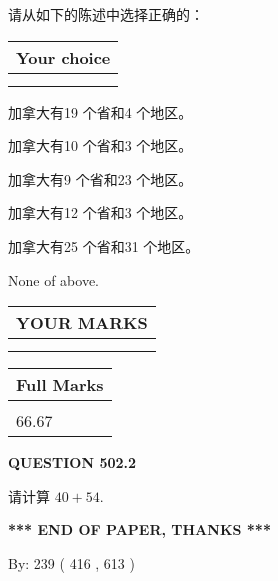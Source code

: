 \documentclass{ctexart}
\begin{document}
  
请从如下的陈述中选择正确的：
  
  
\noindent\hspace{3.0in} \begin{tabular}{|l|}
\hline
Your choice \\
\hline
 \\ 
 \\ 
\hline
\end{tabular}
  
  
 
 
加拿大有19 个省和4 个地区。
 
 
加拿大有10 个省和3 个地区。
 
 
加拿大有9 个省和23 个地区。
 
 
加拿大有12 个省和3 个地区。
 
 
加拿大有25 个省和31 个地区。
 
 
 None of above.
 
 
  
\vspace{0.2in}
  
\noindent\begin{tabular}{|l|}
\hline
 YOUR MARKS  \\
\hline
 \\ 
 \\ 
\hline
\end{tabular}
\hspace{0.05in} \begin{tabular}{|l|}
\hline
 Full Marks  \\
\hline
 \\ 
66.67 \\
\hline
\end{tabular}
{\textbf{\Large{QUESTION
502.2 
}}}
  
  
 
请计算 $ %
40 +  %
54 $.
 

 

 
   
   
 \vspace{0.2in}
 
   
   
   
   
\vspace{1.0in} 
{\textbf{\large{ *** END OF PAPER, THANKS *** }}} 
   
   
\hspace{1.0in} By: 
 239 ( 416 ,  613 )
   
\end{document}
